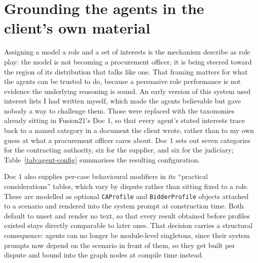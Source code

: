 \section{Grounding the agents in the client's own material}
\label{sec:grounding}

Assigning a model a role and a set of interests is the mechanism
\citet{shanahan2023roleplay} describe as role play: the model is not becoming a
procurement officer, it is being steered toward the region of its distribution
that talks like one. That framing matters for what the agents can be trusted to
do, because a persuasive role performance is not evidence the underlying reasoning
is sound. An early version of this system used interest lists I had written
myself, which
made the agents believable but gave nobody a way to challenge them. Those were
replaced with the taxonomies already sitting in Fusion21's Doc 1, so that every
agent's stated interests trace back to a named category in a document the client
wrote, rather than to my own guess at what a procurement officer cares about. Doc
1 sets out seven categories for the contracting authority, six for the supplier,
and six for the judiciary; Table~\ref{tab:agent-config} summarises the resulting
configuration.

Doc 1 also supplies per-case behavioural modifiers in its ``practical
considerations'' tables, which vary by dispute rather than sitting fixed to a
role. These are modelled as optional \texttt{CAProfile} and \texttt{BidderProfile}
objects attached to a scenario and rendered into the system prompt at
construction time. Both default to unset and render no text, so that every
result obtained before profiles existed stays directly comparable to later ones.
That decision carries a structural consequence: agents can no longer be
module-level singletons, since their system prompts now depend on the scenario in
front of them, so they get built per dispute and bound into the graph nodes at
compile time instead.

